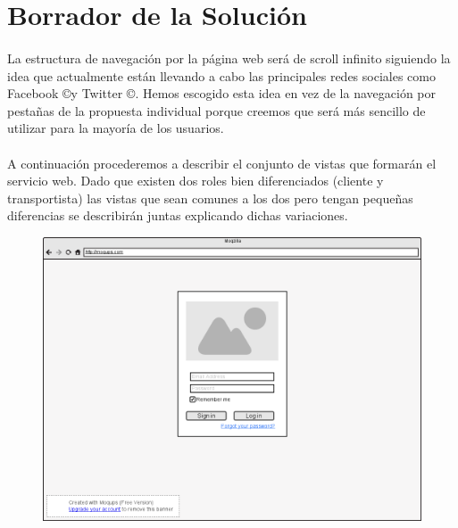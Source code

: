 \documentclass[10pt, a4paper,spanish]{article}
\begin{document}
	\section{Borrador de la Solución}

		\paragraph{}
		La estructura de navegación por la página web será de scroll infinito siguiendo la idea que actualmente están llevando a cabo las principales redes sociales como Facebook \copyright y  Twitter \copyright. Hemos escogido esta idea en vez de la navegación por pestañas de la propuesta individual porque creemos que será más sencillo de utilizar para la mayoría de los usuarios.

		\paragraph{}
		A continuación procederemos a describir el conjunto de vistas que formarán el servicio web. Dado que existen dos roles bien diferenciados (cliente y transportista) las vistas que sean comunes a los dos pero tengan pequeñas diferencias se describirán juntas explicando dichas variaciones.

		\begin{figure}[H]
			\centering
			\begin{minipage}[b]{0.8\textwidth}
				\includegraphics[width=\textwidth]{res/Login.png}
			\end{minipage}
		\end{figure}
\end{document}
